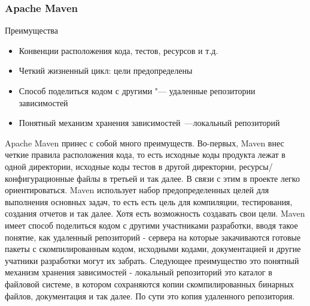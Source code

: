 \documentclass{../industrial-development}
\begin{document}
\begin{frame} \frametitle{Apache Maven}
	\begin{block}{Преимущества}
		\begin{itemize}
			\item Конвенции расположения кода, тестов,
			ресурсов и т.д.
			\item Четкий жизненный цикл: цели предопределены
			\item Способ поделиться кодом с другими "---
			удаленные репозитории зависимостей
			\item Понятный механизм хранения зависимостей~---локальный репозиторий
		\end{itemize}
	\end{block}	
\end{frame}
\lecturenotes
Apache Maven принес с собой много преимуществ. Во-первых, Maven внес четкие правила расположения кода, то есть исходные коды продукта лежат в одной директории, исходные коды тестов в другой директории, ресурсы/конфигурационные файлы в третьей и так далее. В связи с этим в проекте легко ориентироваться.
Maven использует набор предопределенных целей для выполнения основных задач, то есть есть цель для компиляции, тестирования, создания отчетов и так далее. Хотя есть возможность создавать свои цели.
Maven имеет способ поделиться кодом с другими участниками разработки, вводя такое понятие, как удаленный репозиторий - сервера на которые закачиваются готовые пакеты с скомпилированным кодом, исходными кодами, документацией и другие учатники разработки могут их забрать.
Следующее преимущество это понятный механизм хранения зависимостей - локальный репозиторий это каталог в файловой системе, в котором сохраняются копии скомпилированных бинарных файлов, документация и так далее. По сути это копия удаленного репозитория.
~\cite{Yandex_Build_Automation}
\end{document}
